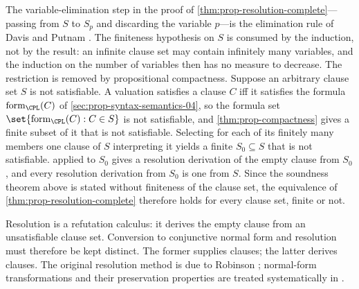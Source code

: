 \begin{remark}
\label{rem:resolution-finiteness}
The variable-elimination step in the proof of
\cref{thm:prop-resolution-complete}---passing from \(S\) to \(S_p\) and
discarding the variable \(p\)---is the elimination rule of Davis and
Putnam \cite{DavisPutnam1960}.  The finiteness hypothesis on \(S\) is
consumed by the induction, not by the result: an infinite clause set may
contain infinitely many variables, and the induction on the number of
variables then has no measure to decrease.  The restriction is removed by
propositional compactness.  Suppose an arbitrary clause set \(S\) is not
satisfiable.  A valuation satisfies a clause \(C\) iff it satisfies the
formula \(\operatorname{form}_{\CPL}(C)\) of
\cref{sec:prop-syntax-semantics-04}, so the formula set
\(\set{\operatorname{form}_{\CPL}(C):C\in S}\) is not satisfiable, and
\cref{thm:prop-compactness} gives a finite subset of it that is not
satisfiable.  Selecting for each of its finitely many members one clause
of \(S\) interpreting it yields a finite \(S_0\subseteq S\) that is not
satisfiable.   applied to \(S_0\)
gives a resolution derivation of the empty clause from \(S_0\), and every
resolution derivation from \(S_0\) is one from \(S\).  Since the
soundness theorem above is stated without finiteness of the clause set,
the equivalence of \cref{thm:prop-resolution-complete} therefore holds
for every clause set, finite or not.
\end{remark}

Resolution is a refutation calculus: it derives the empty clause from an
unsatisfiable clause set.  Conversion to conjunctive normal form and
resolution must therefore be kept distinct.  The former supplies clauses; the
latter derives clauses.  The original resolution method is due to Robinson
\cite{Robinson1965}; normal-form transformations and their preservation
properties are treated systematically in \cite{BaazEglyLeitsch2001}.

